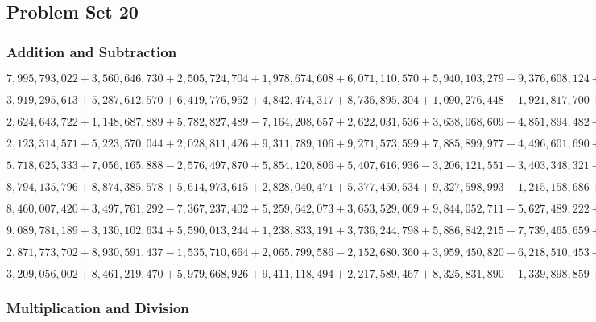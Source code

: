 \hypertarget{problem-set-20-6}{%
\subsection{Problem Set 20}\label{problem-set-20-6}}

\hypertarget{addition-and-subtraction-400}{%
\subsubsection{Addition and
Subtraction}\label{addition-and-subtraction-400}}

\(7,995,793,022+3,560,646,730+2,505,724,704+1,978,674,608+6,071,110,570+5,940,103,279+9,376,608,124+3,920,818,532+4,724,904,102+1,496,006,232\)

\(3,919,295,613+5,287,612,570+6,419,776,952+4,842,474,317+8,736,895,304+1,090,276,448+1,921,817,700+3,761,078,353+5,026,277,170+3,654,582,004\)

\(2,624,643,722+1,148,687,889+5,782,827,489-7,164,208,657+2,622,031,536+3,638,068,609-4,851,894,482-1,902,033,138+8,033,821,886-7,920,829,272\)

\(2,123,314,571+5,223,570,044+2,028,811,426+9,311,789,106+9,271,573,599+7,885,899,977+4,496,601,690+6,193,841,386+3,490,602,304+9,475,836,045\)

\(5,718,625,333+7,056,165,888-2,576,497,870+5,854,120,806+5,407,616,936-3,206,121,551-3,403,348,321-5,830,244,791+1,591,241,098+8,149,912,383\)

\(8,794,135,796+8,874,385,578+5,614,973,615+2,828,040,471+5,377,450,534+9,327,598,993+1,215,158,686+8,800,128,759+4,950,830,268+6,681,369,923\)

\(8,460,007,420+3,497,761,292-7,367,237,402+5,259,642,073+3,653,529,069+9,844,052,711-5,627,489,222+8,143,346,406-1,672,765,194-2,891,467,431\)

\(9,089,781,189+3,130,102,634+5,590,013,244+1,238,833,191+3,736,244,798+5,886,842,215+7,739,465,659+9,381,265,627+7,292,630,557+7,248,282,232\)

\(2,871,773,702+8,930,591,437-1,535,710,664+2,065,799,586-2,152,680,360+3,959,450,820+6,218,510,453-8,752,101,195+6,987,099,009-1,621,429,459\)

\(3,209,056,002+8,461,219,470+5,979,668,926+9,411,118,494+2,217,589,467+8,325,831,890+1,339,898,859+1,856,818,883+2,215,850,534+2,128,096,993\)

\hypertarget{multiplication-and-division-398}{%
\subsubsection{Multiplication and
Division}\label{multiplication-and-division-398}}

